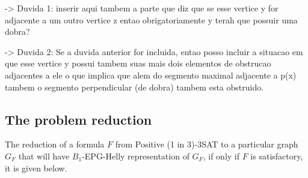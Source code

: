 \documentclass[a4paper,11pt]{article}
\begin{document}
-> Duvida 1: inserir aqui tambem a parte que diz que se esse vertice y for adjacente a um outro vertice z entao obrigatoriamente y terah que possuir uma dobra?

-> Duvida 2: Se a duvida anterior for incluida, entao posso incluir a situacao em que esse vertice y possui tambem suas mais dois elementos de obstrucao adjacentes a ele o que implica que alem do segmento maximal adjacente a p(x) tambem o segmento perpendicular (de dobra) tambem esta obstruido.  


\subsection{The problem reduction}\label{sec:reducao}

The reduction of a formula $F$ from  {\sc Positive (1 in 3)-3SAT}  to a particular graph $G_F$ that will have  $B_{1}$-EPG-Helly representation of $G_F$, if only if $F$ is satisfactory, it is given below.
\end{document}
